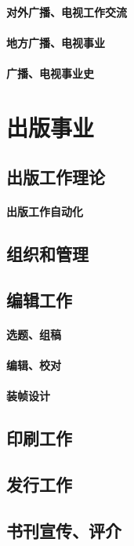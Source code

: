 \documentclass[UTF8]{../../ApplicationUniverse}
\begin{document}
        \subsubsection{对外广播、电视工作交流}
        \subsubsection{地方广播、电视事业}
        \subsubsection{广播、电视事业史}
   





\chapter{出版事业}
\section{出版工作理论}
    \subsubsection{出版工作自动化}
\section{组织和管理}
\section{编辑工作}
    \subsubsection{选题、组稿}
    \subsubsection{编辑、校对}
    \subsubsection{装帧设计}
\section{印刷工作}
\section{发行工作}
\section{书刊宣传、评介}
\end{document}

